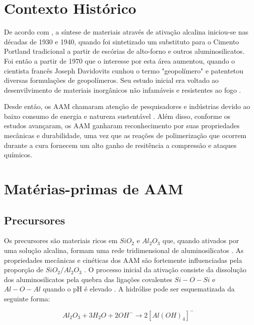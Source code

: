 \section{Contexto Histórico}

De acordo com \cite{pachecotorgal2014handbook}, a síntese de materiais através de ativação alcalina iniciou-se nas décadas de 1930 e 1940, quando foi sintetizado um substituto para o Cimento Portland tradicional a partir de escórias de alto-forno e outros aluminosilicatos.
Foi então a partir de 1970 que o interesse por esta área aumentou, quando o cientista francês Joseph Davidovits cunhou o termo "geopolímero" e patentetou diversas formulações de geopolímeros. Seu estudo inicial era voltado ao desenvilvimento de materiais inorgânicos não infamáveis e resistentes ao fogo \cite{provis2009geopolymers}.

Desde então, os AAM chamaram atenção de pesquisadores e indústrias devido ao baixo consumo de energia e natureza sustentável \cite{qin2022onepart}.
Além disso, conforme os estudos avançaram, os AAM ganharam reconhecimento por suas propriedades mecânicas e durabilidade, uma vez que as reações de polimerização que ocorrem durante a cura fornecem um alto ganho de resitência a compressão e ataques químicos.

\section{Matérias-primas de AAM}

\subsection{Precursores}

Os precursores são materiais ricos em $SiO_2$ e $Al_2O_3$ que, quando ativados por uma solução alcalina, formam uma rede tridimensional de aluminosilicatos \cite{rakhimova2019metakaolin}.
As propriedades mecânicas e cinéticas dos AAM são fortemente influenciadas pela proporção de $SiO_2/Al_2O_3$ \cite{provis2007geopolymerisation}.
O processo inicial da ativação consiste da dissolução dos aluminosilicatos pela quebra das ligações covalentes $Si-O-Si$ e $Al-O-Al$ quando o pH é elevado \cite{Severo2013}. A hidrólise pode ser esquematizada da seguinte forma:

\begin{equation}
  Al_2O_3 + 3H_2O + 2OH^- \rightarrow 2\left[Al(OH)_4\right]^- 
\end{equation}

